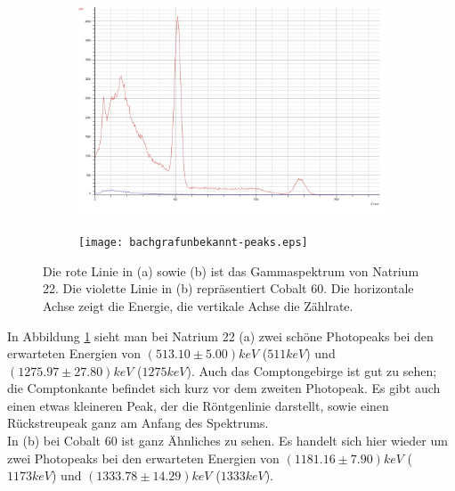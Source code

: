 \documentclass{article}
\begin{document}
\begin{center}
\begin{figure}[H]
\begin{subfigure}{0.52\textwidth}
\includegraphics[width=0.9\linewidth]{bachgrafbild.jpg}
\caption{}
\end{subfigure}
\begin{subfigure}{0.52\textwidth}
\texttt{[image: bachgrafunbekannt-peaks.eps]}
\caption{}
\end{subfigure}
\caption{Die rote Linie in (a) sowie (b) ist das Gammaspektrum von Natrium 22. Die violette Linie in (b) repräsentiert Cobalt 60. Die horizontale Achse zeigt die Energie, die vertikale Achse die Zählrate.}
\label{fig:szint}
\end{figure}
\end{center}
In Abbildung \ref{fig:szint} sieht man bei Natrium 22 (a) zwei schöne Photopeaks bei den erwarteten Energien von $(513.10 \pm 5.00)\si{keV}$ ($511\si{keV}$) und $(1275.97 \pm 27.80)\si{keV}$ ($1275\si{keV}$). Auch das Comptongebirge ist gut zu sehen; die Comptonkante befindet sich kurz vor dem zweiten Photopeak. Es gibt auch einen etwas kleineren Peak, der die Röntgenlinie darstellt, sowie einen Rückstreupeak ganz am Anfang des Spektrums.\\
In (b) bei Cobalt 60 ist ganz Ähnliches zu sehen. Es handelt sich hier wieder um zwei Photopeaks bei den erwarteten Energien von $(1181.16 \pm 7.90)\si{keV}$ ($1173\si{keV}$) und $(1333.78 \pm 14.29)\si{keV}$ ($1333\si{keV}$).
\end{document}
